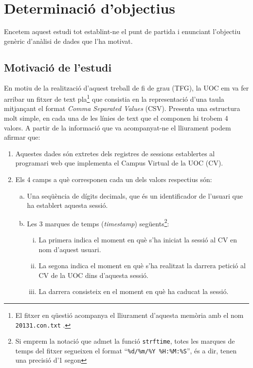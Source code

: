 \documentclass[
	a4paper,
	twoside,
	justified
]{tufte-book}
\begin{document}
\mainmatter\setcounter{page}{1}

\chapter{Determinació d'objectius}

Encetem aquest estudi tot establint-ne el punt de partida i enunciant l'objectiu genèric d'anàlisi de dades que l'ha motivat.

\section{Motivació de l'estudi}

En motiu de la realització d'aquest treball de fi de grau (TFG), la UOC em va fer arribar un fitxer de text pla\footnote{El fitxer en qüestió acompanya el lliurament d'aquesta memòria amb el nom \texttt{20131.con.txt} .} que consistia en la representació d'una taula mitjançant el format \emph{Comma Separated Values} (CSV). Presenta una estructura molt simple, en cada una de les línies de text que el componen hi trobem 4 valors. A partir de la informació que va acompanyat-ne el lliurament podem afirmar que:
 
\begin{enumerate}[(1)]
  \item Aquestes dades són extretes dels registres de sessions establertes al programari web que implementa el Campus Virtual de la UOC (CV).
  \item Els 4 camps a què corresponen cada un dels valors respectius són:
  \begin{enumerate}[(a)]
    \item Una seqüència de dígits decimals, que és un identificador de l'usuari que ha establert aquesta sessió.
    \item Les 3 marques de temps (\emph{timestamp}) següents\footnote[][-3\baselineskip]{Si emprem la notació que admet la funció \texttt{strftime}, totes les marques de temps del fitxer segueixen el format ``\texttt{\%d/\%m/\%Y \%H:\%M:\%S}'', és a dir, tenen una precisió d'1 segon}:
    \begin{enumerate}[(i)] 
 		\item La primera indica el moment en què s'ha iniciat la sessió al CV en nom d'aquest usuari.
    \item La segona indica el moment en què s'ha realitzat la darrera petició al CV de la UOC dins d'aquesta sessió.
    \item La darrera consisteix en el moment en què ha caducat la sessió.
    \end{enumerate}  
  \end{enumerate}  
\end{enumerate}
\end{document}
